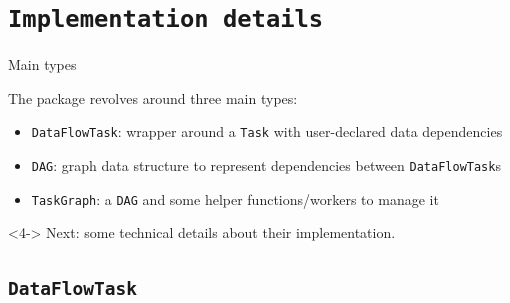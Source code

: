 \documentclass{beamer}
\begin{document}
\section{\texttt{Implementation details}}

\begin{frame}{Main types}

The package revolves around three main types:
\begin{itemize}
  \item <1->\texttt{DataFlowTask}: wrapper around a
  \texttt{Task} with user-declared data dependencies
  \item <2->\texttt{DAG}: graph data
  structure to represent dependencies between \texttt{DataFlowTask}s
  \item <3->\texttt{TaskGraph}: a
  \texttt{DAG} and some helper functions/workers to manage it

\end{itemize}

\begin{alertblock}<4->{}
  Next: some technical details about their
  implementation.
\end{alertblock}

\end{frame}

\subsection{\texttt{DataFlowTask}}
\end{document}

